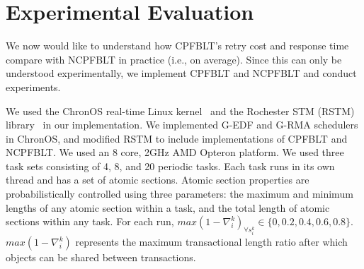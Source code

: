 \documentclass[conference]{IEEEtran}
\begin{document}
\section{Experimental Evaluation}\label{exp_eval}
%
We now would like to understand how CPFBLT's retry cost and response time compare with NCPFBLT in practice (i.e., on average). Since this can only be understood experimentally, we implement CPFBLT and NCPFBLT and conduct experiments. 

We used the ChronOS real-time Linux kernel~\cite{dellinger2011chronos} and the Rochester STM (RSTM) library~\cite{marathe2006lowering} in our implementation. We implemented G-EDF and G-RMA schedulers in ChronOS, and modified RSTM to include implementations of CPFBLT and NCPFBLT. We used an 8 core, 2GHz AMD Opteron platform. We used three task sets consisting of 4, 8, and 20 periodic tasks. Each task runs in its own thread and has a set of atomic sections. Atomic section properties are probabilistically controlled using three parameters: the maximum and minimum lengths of any atomic section within a task, and the total length of atomic sections within any task. For each run, $max(1-\nabla_i^k)_{\forall s_i^k} \in \{0,0.2,0.4,0.6,0.8\}$. $max(1-\nabla_i^k)$ represents the maximum transactional length ratio after which objects can be shared between transactions.
\end{document}
